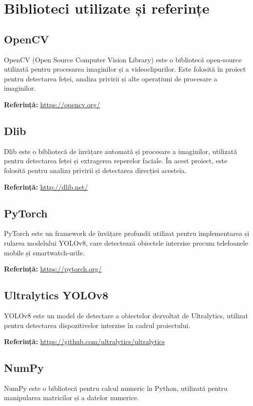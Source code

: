 \documentclass[12pt,a4paper]{article}
\begin{document}
\section{Biblioteci utilizate și referințe}
\subsection{OpenCV}
OpenCV (Open Source Computer Vision Library) este o bibliotecă open-source utilizată pentru procesarea imaginilor și a videoclipurilor. Este folosită în proiect pentru detectarea feței, analiza privirii și alte operațiuni de procesare a imaginilor.

\textbf{Referință:} \url{https://opencv.org/}

\subsection{Dlib}
Dlib este o bibliotecă de învățare automată și procesare a imaginilor, utilizată pentru detectarea feței și extragerea reperelor faciale. În acest proiect, este folosită pentru analiza privirii și detectarea direcției acesteia.

\textbf{Referință:} \url{http://dlib.net/}

\subsection{PyTorch}
PyTorch este un framework de învățare profundă utilizat pentru implementarea și rularea modelului YOLOv8, care detectează obiectele interzise precum telefoanele mobile și smartwatch-urile.

\textbf{Referință:} \url{https://pytorch.org/}

\subsection{Ultralytics YOLOv8}
YOLOv8 este un model de detectare a obiectelor dezvoltat de Ultralytics, utilizat pentru detectarea dispozitivelor interzise în cadrul proiectului.

\textbf{Referință:} \url{https://github.com/ultralytics/ultralytics}

\subsection{NumPy}
NumPy este o bibliotecă pentru calcul numeric în Python, utilizată pentru manipularea matricilor și a datelor numerice.
\end{document}
